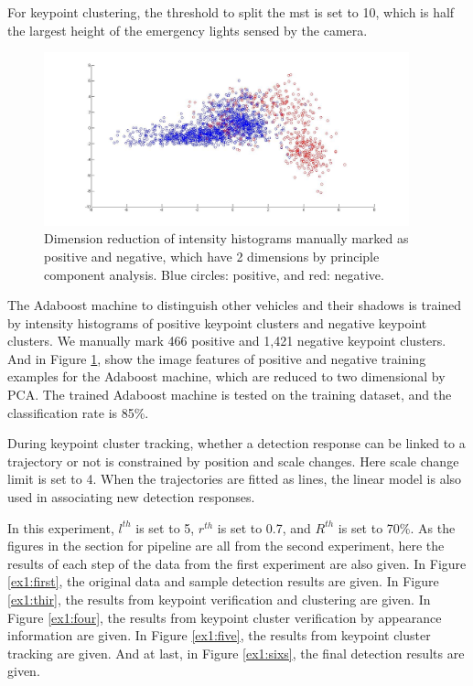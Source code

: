For keypoint clustering, the threshold to split the mst is set to 10, which is half the largest height of the emergency lights sensed by the camera.

\begin{figure}
\includegraphics[width=0.94\textwidth,bb=0 0 1367 651]{untitled.jpg}
\caption[Positive and negative training examples.]{Dimension reduction of intensity histograms manually marked as positive and negative, which have 2 dimensions by principle component analysis. Blue circles: positive, and red: negative.}
\label{ex1:v}
\end{figure}

 The Adaboost machine to distinguish other vehicles and their shadows is trained by intensity histograms of positive keypoint clusters and negative keypoint clusters. We manually mark 466 positive  and 1,421 negative keypoint clusters. And in Figure \ref{ex1:v}, show the image features of positive and negative training examples for the Adaboost machine, which are reduced to two dimensional by PCA. The trained Adaboost machine is tested on the training dataset, and the classification rate is 85\%.

During keypoint cluster tracking, whether a detection response can be linked to a trajectory or not is constrained by position and scale changes. Here scale change limit is set to 4. When the trajectories are fitted as lines, the linear model is also used in associating new detection responses.


In this experiment, $l^{th}$ is set to 5, $r^{th}$ is set to 0.7, and $R^{th}$ is set to 70\%. As the figures in the section for pipeline are all from the second experiment, here the results of each step of the data from the first experiment are also given. In Figure \ref{ex1:first}, the original data and sample detection results are given. In Figure \ref{ex1:thir}, the results from keypoint verification and clustering are given. In Figure \ref{ex1:four}, the results from keypoint cluster verification by appearance information are given. In Figure \ref{ex1:five}, the results from keypoint cluster tracking are given. And at last, in Figure \ref{ex1:sixs}, the final detection results are given.

